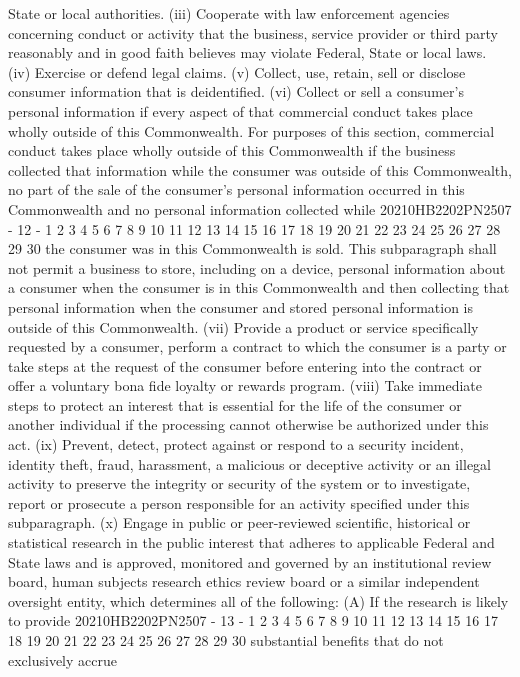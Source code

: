 State or local authorities.
(iii) Cooperate with law enforcement agencies
concerning conduct or activity that the business, service
provider or third party reasonably and in good faith
believes may violate Federal, State or local laws.
(iv) Exercise or defend legal claims.
(v) Collect, use, retain, sell or disclose consumer
information that is deidentified.
(vi) Collect or sell a consumer's personal
information if every aspect of that commercial conduct
takes place wholly outside of this Commonwealth. For
purposes of this section, commercial conduct takes place
wholly outside of this Commonwealth if the business
collected that information while the consumer was outside
of this Commonwealth, no part of the sale of the
consumer's personal information occurred in this
Commonwealth and no personal information collected while
20210HB2202PN2507 - 12 -
1
2
3
4
5
6
7
8
9
10
11
12
13
14
15
16
17
18
19
20
21
22
23
24
25
26
27
28
29
30
the consumer was in this Commonwealth is sold. This
subparagraph shall not permit a business to store,
including on a device, personal information about a
consumer when the consumer is in this Commonwealth and
then collecting that personal information when the
consumer and stored personal information is outside of
this Commonwealth.
(vii) Provide a product or service specifically
requested by a consumer, perform a contract to which the
consumer is a party or take steps at the request of the
consumer before entering into the contract or offer a
voluntary bona fide loyalty or rewards program.
(viii) Take immediate steps to protect an interest
that is essential for the life of the consumer or another
individual if the processing cannot otherwise be
authorized under this act.
(ix) Prevent, detect, protect against or respond to
a security incident, identity theft, fraud, harassment, a
malicious or deceptive activity or an illegal activity to
preserve the integrity or security of the system or to
investigate, report or prosecute a person responsible for
an activity specified under this subparagraph.
(x) Engage in public or peer-reviewed scientific,
historical or statistical research in the public interest
that adheres to applicable Federal and State laws and is
approved, monitored and governed by an institutional
review board, human subjects research ethics review board
or a similar independent oversight entity, which
determines all of the following:
(A) If the research is likely to provide
20210HB2202PN2507 - 13 -
1
2
3
4
5
6
7
8
9
10
11
12
13
14
15
16
17
18
19
20
21
22
23
24
25
26
27
28
29
30
substantial benefits that do not exclusively accrue
